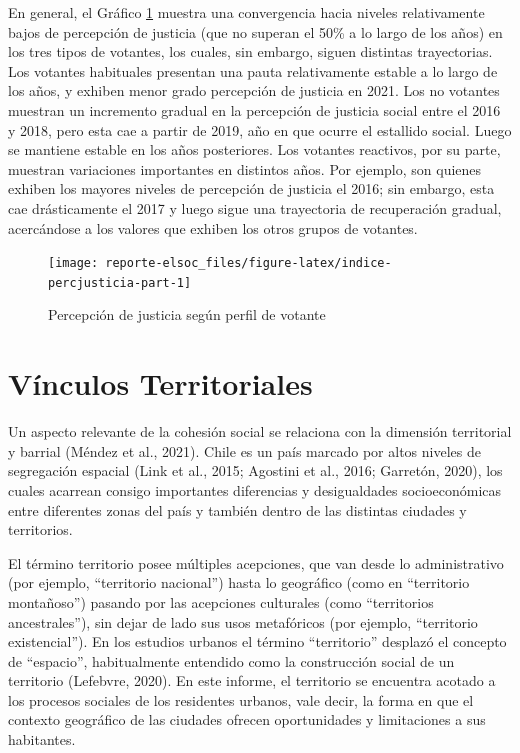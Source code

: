 \documentclass[
  12pt,
]{book}
\begin{document}
En general, el Gráfico \ref{fig:indice-percjusticia-part} muestra una convergencia hacia niveles relativamente bajos de percepción de justicia (que no superan el 50\% a lo largo de los años) en los tres tipos de votantes, los cuales, sin embargo, siguen distintas trayectorias. Los votantes habituales presentan una pauta relativamente estable a lo largo de los años, y exhiben menor grado percepción de justicia en 2021. Los no votantes muestran un incremento gradual en la percepción de justicia social entre el 2016 y 2018, pero esta cae a partir de 2019, año en que ocurre el estallido social. Luego se mantiene estable en los años posteriores. Los votantes reactivos, por su parte, muestran variaciones importantes en distintos años. Por ejemplo, son quienes exhiben los mayores niveles de percepción de justicia el 2016; sin embargo, esta cae drásticamente el 2017 y luego sigue una trayectoria de recuperación gradual, acercándose a los valores que exhiben los otros grupos de votantes.

\begin{figure}

{\centering \texttt{[image: reporte-elsoc\_files/figure-latex/indice-percjusticia-part-1]} 

}

\caption{Percepción de justicia según perfil de votante}\label{fig:indice-percjusticia-part}
\end{figure}

\hypertarget{vuxednculos-territoriales}{%
\section{Vínculos Territoriales}\label{vuxednculos-territoriales}}

Un aspecto relevante de la cohesión social se relaciona con la dimensión territorial y barrial (Méndez et al., 2021). Chile es un país marcado por altos niveles de segregación espacial (Link et al., 2015; Agostini et al., 2016; Garretón, 2020), los cuales acarrean consigo importantes diferencias y desigualdades socioeconómicas entre diferentes zonas del país y también dentro de las distintas ciudades y territorios.

El término territorio posee múltiples acepciones, que van desde lo administrativo (por ejemplo, ``territorio nacional'') hasta lo geográfico (como en ``territorio montañoso'') pasando por las acepciones culturales (como ``territorios ancestrales''), sin dejar de lado sus usos metafóricos (por ejemplo, ``territorio existencial''). En los estudios urbanos el término ``territorio'' desplazó el concepto de ``espacio'', habitualmente entendido como la construcción social de un territorio (Lefebvre, 2020). En este informe, el territorio se encuentra acotado a los procesos sociales de los residentes urbanos, vale decir, la forma en que el contexto geográfico de las ciudades ofrecen oportunidades y limitaciones a sus habitantes.
\end{document}
